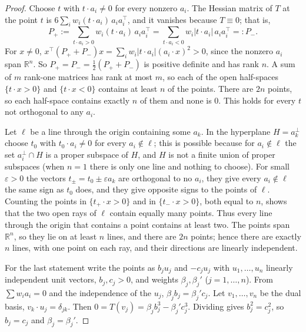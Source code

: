 \documentclass[11pt]{article}
\theoremstyle{remark}
\begin{document}
\begin{proof}
Choose $t$ with $t\cdot a_i\ne0$ for every nonzero $a_i$. The Hessian matrix of $T$ at the point $t$ is $6\sum_iw_i(t\cdot a_i)\,a_ia_i^{\top}$, and it vanishes because $T\equiv0$; that is,
\[
P_+:=\sum_{t\cdot a_i>0}w_i(t\cdot a_i)\,a_ia_i^{\top}=\sum_{t\cdot a_i<0}w_i|t\cdot a_i|\,a_ia_i^{\top}=:P_- .
\]
For $x\ne0$, $x^{\top}(P_++P_-)x=\sum_iw_i|t\cdot a_i|(a_i\cdot x)^2>0$, since the nonzero $a_i$ span $\mathbb{R}^n$. So $P_+=P_-=\frac12(P_++P_-)$ is positive definite and has rank $n$. A sum of $m$ rank-one matrices has rank at most $m$, so each of the open half-spaces $\{t\cdot x>0\}$ and $\{t\cdot x<0\}$ contains at least $n$ of the points. There are $2n$ points, so each half-space contains exactly $n$ of them and none is $0$. This holds for every $t$ not orthogonal to any $a_i$.

Let $\ell$ be a line through the origin containing some $a_k$. In the hyperplane $H=a_k^{\perp}$ choose $t_0$ with $t_0\cdot a_i\ne0$ for every $a_i\notin\ell$; this is possible because for $a_i\notin\ell$ the set $a_i^{\perp}\cap H$ is a proper subspace of $H$, and $H$ is not a finite union of proper subspaces (when $n=1$ there is only one line and nothing to choose). For small $\varepsilon>0$ the vectors $t_\pm=t_0\pm\varepsilon a_k$ are orthogonal to no $a_i$, they give every $a_i\notin\ell$ the same sign as $t_0$ does, and they give opposite signs to the points of $\ell$. Counting the points in $\{t_+\cdot x>0\}$ and in $\{t_-\cdot x>0\}$, both equal to $n$, shows that the two open rays of $\ell$ contain equally many points. Thus every line through the origin that contains a point contains at least two. The points span $\mathbb{R}^n$, so they lie on at least $n$ lines, and there are $2n$ points; hence there are exactly $n$ lines, with one point on each ray, and their directions are linearly independent.

For the last statement write the points as $b_ju_j$ and $-c_ju_j$ with $u_1,\dots,u_n$ linearly independent unit vectors, $b_j,c_j>0$, and weights $\beta_j,\beta_j'$ ($j=1,\dots,n$). From $\sum w_ia_i=0$ and the independence of the $u_j$, $\beta_jb_j=\beta_j'c_j$. Let $v_1,\dots,v_n$ be the dual basis, $v_k\cdot u_j=\delta_{jk}$. Then $0=T(v_j)=\beta_jb_j^3-\beta_j'c_j^3$. Dividing gives $b_j^2=c_j^2$, so $b_j=c_j$ and $\beta_j=\beta_j'$.
\end{proof}
\end{document}
